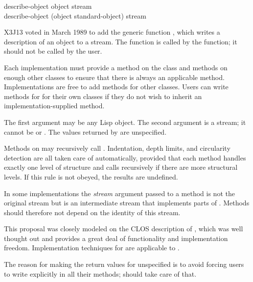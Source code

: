 \begin{defun}
describe-object object stream \\
describe-object (object standard-object) stream

X3J13 voted in March 1989  to add
  the generic function , which writes a description of an object to a
  stream.  The function  is called by the  function; it
  should not be called by the user.

  Each implementation must provide a method on the class
   and methods on enough other classes to ensure that
  there is always an applicable method.  Implementations are free to add
  methods for other classes.  Users can write methods for  for
  their own classes if they do not wish to inherit an implementation-supplied
  method.

   The first argument may be any Lisp object.  The second argument is a stream; it
   cannot be  or .
   The values returned by  are unspecified.

   Methods on  may recursively call .  Indentation,
   depth limits, and circularity detection are all taken care of automatically,
   provided that each method handles exactly one level of structure and calls
    recursively if there are more structural levels.
   If this rule is not obeyed, the results are undefined.

   In some implementations the \emph{stream} argument passed to a 
   method is not the original stream but is an intermediate stream that
   implements parts of .  Methods should therefore not depend on the
   identity of this stream.

\beforenoterule
\begin{rationale}
 This proposal was closely modeled on the CLOS description of ,
 which was well thought out and provides a great deal of functionality and
 implementation freedom.  Implementation techniques for
  are applicable to .

 The reason for making the return values for  unspecified is to
 avoid forcing users to write  explicitly in all their methods;
  should take care of that.
\end{rationale}
\afternoterule
\end{defun}

